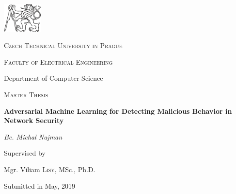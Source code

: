 \documentclass[twoside, 11pt]{article}
\begin{document}


\thispagestyle{empty}
\begin{center}
	\includegraphics[width=0.15\textwidth]{ctulogo}\par\vspace{0.6cm}
	{\scshape\LARGE Czech Technical University in Prague \par}
	{\scshape Faculty of Electrical Engineering \par}
	{Department of Computer Science \par}
	\vspace{0.7cm}
	{\scshape\Large Master Thesis\par}

	\vspace{2 cm}
	{\Huge\bfseries Adversarial Machine Learning for Detecting Malicious Behavior in Network Security \par}
	\vspace{1.5cm}
	{\Large\itshape Bc. Michal Najman\par}

	\vspace{4cm}
	Supervised by\par
	\vspace{1mm}
	Mgr. Viliam \textsc{Lisý}, MSc., Ph.D.

	\vfill

	{Submitted in May, 2019\par}
\end{center}


\cleardoublepage


\thispagestyle{plain}



\cleardoublepage
\end{document}
